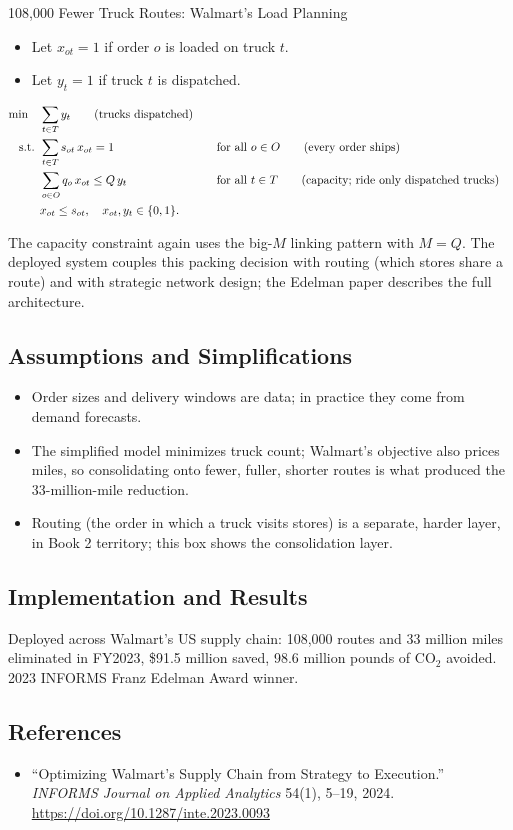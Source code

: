 \begin{casestudybox}{108{,}000 Fewer Truck Routes: Walmart's Load Planning}
\begin{itemize}
\item Let $x_{ot} = 1$ if order $o$ is loaded on truck $t$.
\item Let $y_t = 1$ if truck $t$ is dispatched.
\end{itemize}

\begin{align*}
\min \quad & \sum_{t \in T} y_t   \tag{trucks dispatched} \\
\text{ s.t. }        & \sum_{t \in T} s_{ot}\, x_{ot} = 1 &&\quad \text{for all } o \in O   \tag{every order ships} \\
           & \sum_{o \in O} q_o\, x_{ot} \leq Q\, y_t &&\quad \text{for all } t \in T   \tag{capacity; ride only dispatched trucks} \\
           & x_{ot} \leq s_{ot}, \quad x_{ot}, y_t \in \{0,1\}.
\end{align*}

The capacity constraint again uses the big-$M$ linking pattern with $M = Q$.  The deployed system couples this packing decision with routing (which stores share a route) and with strategic network design; the Edelman paper describes the full architecture.

\subsection*{Assumptions and Simplifications}
\begin{itemize}
\item Order sizes and delivery windows are data; in practice they come from demand forecasts.
\item The simplified model minimizes truck count; Walmart's objective also prices miles, so consolidating onto fewer, fuller, shorter routes is what produced the 33-million-mile reduction.
\item Routing (the order in which a truck visits stores) is a separate, harder layer, in Book 2 territory; this box shows the consolidation layer.
\end{itemize}

\subsection*{Implementation and Results}
Deployed across Walmart's US supply chain: 108{,}000 routes and 33 million miles eliminated in FY2023, \$91.5 million saved, 98.6 million pounds of CO$_2$ avoided.  2023 INFORMS Franz Edelman Award winner.

\subsection*{References}
\begin{itemize}
\item ``Optimizing Walmart's Supply Chain from Strategy to Execution.'' \emph{INFORMS Journal on Applied Analytics} 54(1), 5--19, 2024. \url{https://doi.org/10.1287/inte.2023.0093}
\end{itemize}
\end{casestudybox}

